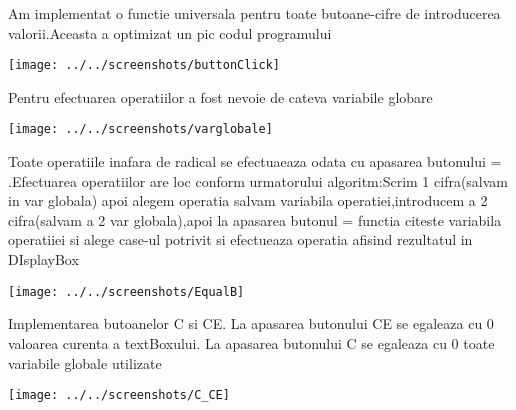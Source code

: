 Am implementat o functie universala pentru toate butoane-cifre de introducerea valorii.Aceasta a optimizat un pic codul programului
\begin{center}
\texttt{[image: ../../screenshots/buttonClick]}
\end{center}

Pentru efectuarea operatiilor a fost nevoie de cateva variabile globare
\begin{center}
\texttt{[image: ../../screenshots/varglobale]}
\end{center}
Toate operatiile inafara de radical se efectuaeaza odata cu apasarea butonului = .Efectuarea operatiilor are loc conform urmatorului algoritm:Scrim 1 cifra(salvam in var globala) apoi alegem operatia salvam variabila operatiei,introducem a 2 cifra(salvam a 2 var globala),apoi la apasarea butonul = functia citeste variabila operatiiei si alege case-ul potrivit si efectueaza operatia afisind rezultatul in DIsplayBox
\begin{center}
\texttt{[image: ../../screenshots/EqualB]}
\end{center}

Implementarea butoanelor C si CE.
La apasarea butonului CE se egaleaza cu 0 valoarea curenta a textBoxului.
La apasarea butonului C se egaleaza cu 0 toate variabile globale utilizate 
\begin{center}
\texttt{[image: ../../screenshots/C\_CE]}
\end{center}

